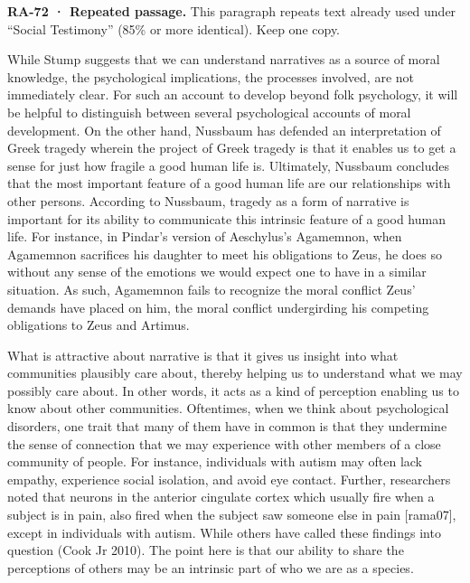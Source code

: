 \documentclass[
  letterpaper,
  DIV=11,
  numbers=noendperiod]{scrartcl}
\theoremstyle{remark}
\begin{document}
\begin{tcolorbox}[enhanced jigsaw, arc=.35mm, bottomrule=.15mm, bottomtitle=1mm, breakable, colback=white, colbacktitle=quarto-callout-important-color!10!white, colframe=quarto-callout-important-color-frame, coltitle=black, left=2mm, leftrule=.75mm, opacityback=0, opacitybacktitle=0.6, rightrule=.15mm, title=\textcolor{quarto-callout-important-color}{\faExclamation}\hspace{0.5em}{Important}, titlerule=0mm, toprule=.15mm, toptitle=1mm]

\textbf{RA-72 · Repeated passage.} This paragraph repeats text already
used under ``Social Testimony'' (85\% or more identical). Keep one copy.

\end{tcolorbox}

While Stump suggests that we can understand narratives as a source of
moral knowledge, the psychological implications, the processes involved,
are not immediately clear. For such an account to develop beyond folk
psychology, it will be helpful to distinguish between several
psychological accounts of moral development. On the other hand, Nussbaum
has defended an interpretation of Greek tragedy wherein the project of
Greek tragedy is that it enables us to get a sense for just how fragile
a good human life is. Ultimately, Nussbaum concludes that the most
important feature of a good human life are our relationships with other
persons. According to Nussbaum, tragedy as a form of narrative is
important for its ability to communicate this intrinsic feature of a
good human life. For instance, in Pindar's version of Aeschylus's
Agamemnon, when Agamemnon sacrifices his daughter to meet his
obligations to Zeus, he does so without any sense of the emotions we
would expect one to have in a similar situation. As such, Agamemnon
fails to recognize the moral conflict Zeus' demands have placed on him,
the moral conflict undergirding his competing obligations to Zeus and
Artimus.

What is attractive about narrative is that it gives us insight into what
communities plausibly care about, thereby helping us to understand what
we may possibly care about. In other words, it acts as a kind of
perception enabling us to know about other communities. Oftentimes, when
we think about psychological disorders, one trait that many of them have
in common is that they undermine the sense of connection that we may
experience with other members of a close community of people. For
instance, individuals with autism may often lack empathy, experience
social isolation, and avoid eye contact. Further, researchers noted that
neurons in the anterior cingulate cortex which usually fire when a
subject is in pain, also fired when the subject saw someone else in pain
{[}rama07{]}, except in individuals with autism. While others have
called these findings into question (Cook Jr 2010). The point here is
that our ability to share the perceptions of others may be an intrinsic
part of who we are as a species.
\end{document}
